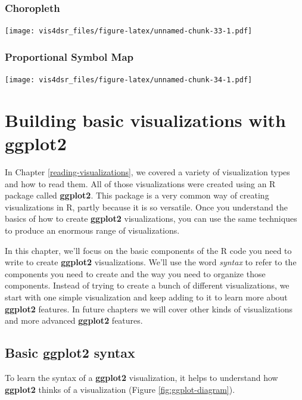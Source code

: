 \documentclass[
]{krantz}
\begin{document}
\hypertarget{choropleth}{%
\subsection{Choropleth}\label{choropleth}}

\texttt{[image: vis4dsr\_files/figure-latex/unnamed-chunk-33-1.pdf]}

\hypertarget{proportional-symbol-map}{%
\subsection{Proportional Symbol Map}\label{proportional-symbol-map}}

\texttt{[image: vis4dsr\_files/figure-latex/unnamed-chunk-34-1.pdf]}

\hypertarget{building-basic-visualizations}{%
\chapter{Building basic visualizations with ggplot2}\label{building-basic-visualizations}}

In Chapter \ref{reading-visualizations}, we covered a variety of visualization types
and how to read them. All
of those visualizations were created using an R package called \textbf{ggplot2}. This
package is a very common way of creating visualizations in R, partly because it is
so versatile. Once you understand the basics of how to create \textbf{ggplot2} visualizations,
you can use the same techniques to produce an enormous range of visualizations.

In this chapter, we'll focus on the basic components of the R code you need to write
to create \textbf{ggplot2} visualizations. We'll use the word \emph{syntax} to refer to the
components you need to create and the way you need to organize those components.
Instead of trying to create a bunch of different visualizations, we start with one
simple visualization and keep adding to it to learn more about \textbf{ggplot2} features.
In future chapters we will cover other kinds of visualizations and more advanced
\textbf{ggplot2} features.

\hypertarget{basic-ggplot2-syntax}{%
\section{Basic ggplot2 syntax}\label{basic-ggplot2-syntax}}

To learn the syntax of a \textbf{ggplot2} visualization, it helps to understand how
\textbf{ggplot2} thinks of a visualization (Figure \ref{fig:ggplot-diagram}).
\end{document}
